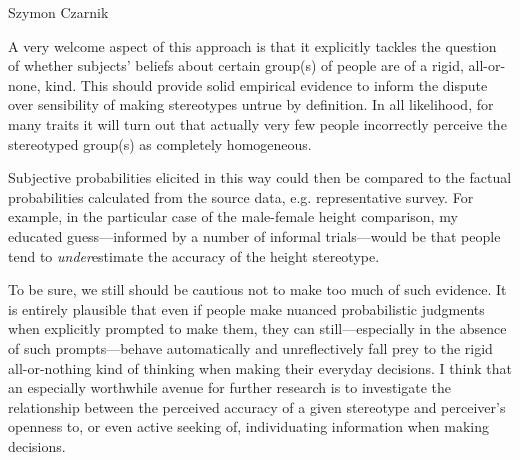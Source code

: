 \begin{artengenv}{Szymon Czarnik}

A very welcome aspect of this approach is that it explicitly tackles the question of whether subjects' beliefs about certain group(s) of people are of a rigid, all-or-none, kind. This should provide solid empirical evidence to inform the dispute over sensibility of making stereotypes untrue by definition. In all likelihood, for many traits it will turn out that actually very few people incorrectly perceive the stereotyped group(s) as completely homogeneous.

Subjective probabilities elicited in this way could then be compared to the factual probabilities calculated from the source data, e.g. representative survey. For example, in the particular case of the male-female height comparison, my educated guess—informed by a number of informal trials—would be that people tend to \textit{under}estimate the accuracy of the height stereotype.

To be sure, we still should be cautious not to make too much of such evidence. It is entirely plausible that even if people make nuanced probabilistic judgments when explicitly prompted to make them, they can still—especially in the absence of such prompts—behave automatically and unreflectively fall prey to the rigid all-or-nothing kind of thinking when making their everyday decisions. I think that an especially worthwhile avenue for further research is to investigate the relationship between the perceived accuracy of a given stereotype and perceiver's openness to, or even active seeking of, individuating information when making decisions.


\end{artengenv}
